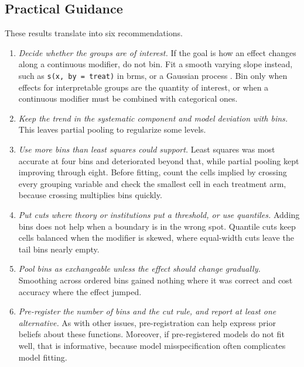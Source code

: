 \documentclass[12pt]{article}
\begin{document}
\subsection{Practical Guidance}

These results translate into six recommendations.

\begin{enumerate}
\item \textit{Decide whether the groups are of interest.}
If the goal is how an effect changes along a continuous modifier, do not bin.
Fit a smooth varying slope instead, such as \texttt{s(x, by = treat)} in brms, or a Gaussian process \citep{Pratietal2023}.
Bin only when effects for interpretable groups are the quantity of interest, or when a continuous modifier must be combined with categorical ones.

\item \textit{Keep the trend in the systematic component and model deviation with bins.}
This leaves partial pooling to regularize some levels. 

\item \textit{Use more bins than least squares could support.}
Least squares was most accurate at four bins and deteriorated beyond that, while partial pooling kept improving through eight.
Before fitting, count the cells implied by crossing every grouping variable and check the smallest cell in each treatment arm, because crossing multiplies bins quickly.

\item \textit{Put cuts where theory or institutions put a threshold, or use quantiles.}
Adding bins does not help when a boundary is in the wrong spot.
Quantile cuts keep cells balanced when the modifier is skewed, where equal-width cuts leave the tail bins nearly empty.

\item \textit{Pool bins as exchangeable unless the effect should change gradually.}
Smoothing across ordered bins gained nothing where it was correct and cost accuracy where the effect jumped.

\item \textit{Pre-register the number of bins and the cut rule, and report at least one alternative.}
As with other issues, pre-registration can help express prior beliefs about these functions. 
Moreover, if pre-registered models do not fit well, that is informative, because model misspecification often complicates model fitting.
\end{enumerate}
\end{document}
